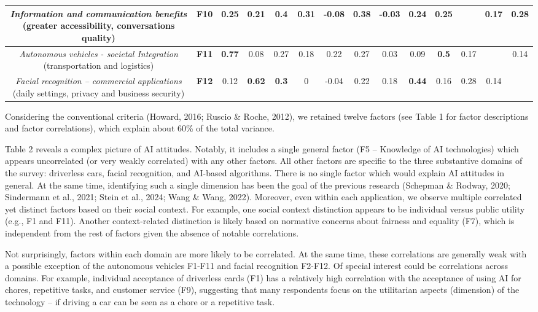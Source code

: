 {\begin{tabular}{c | c | c | c | c | c | c | c | c | c | c | c | c | c}
  \hline
  \textit{Information and communication benefits } (greater accessibility, conversations quality) & \textbf{F10} & 0.25 & 0.21 & \textbf{0.4} & \textbf{0.31} & -0.08 & \textbf{0.38} & -0.03 & 0.24 & 0.25 &  & 0.17 & 0.28 \\
  \hline
  \textit{Autonomous vehicles - societal Integration} (transportation and logistics) & \textbf{F11} & \textbf{0.77} & 0.08 & 0.27 & 0.18 & 0.22 & 0.27 & 0.03 & 0.09 & \textbf{0.5} & 0.17 &  & 0.14 \\
  \hline
  \textit{Facial recognition – commercial applications} (daily settings, privacy and business security) & \textbf{F12} & 0.12 & \textbf{0.62} & \textbf{0.3} & 0 & -0.04 & 0.22 & 0.18 & \textbf{0.44} & 0.16 & 0.28 & 0.14 &  \\
  \hline
\end{tabular}
}

Considering the conventional criteria (Howard, 2016; Ruscio \& Roche, 2012), we retained twelve factors (see Table 1 for factor descriptions and factor correlations), which explain about 60\% of the total variance.

Table 2 reveals a complex picture of AI attitudes. Notably, it includes a single general factor (F5 – Knowledge of AI technologies) which appears uncorrelated (or very weakly correlated) with any other factors. All other factors are specific to the three substantive domains of the survey: driverless cars, facial recognition, and AI-based algorithms. There is no single factor which would explain AI attitudes in general. At the same time, identifying such a single dimension has been the goal of the previous research (Schepman \& Rodway, 2020; Sindermann et al., 2021; Stein et al., 2024; Wang \& Wang, 2022). Moreover, even within each application, we observe multiple correlated yet distinct factors based on their social context. For example, one social context distinction appears to be individual versus public utility (e.g., F1 and F11). Another context-related distinction is likely based on normative concerns about fairness and equality (F7), which is independent from the rest of factors given the absence of notable correlations. 

Not surprisingly, factors within each domain are more likely to be correlated. At the same time, these correlations are generally weak with a possible exception of the autonomous vehicles F1-F11 and facial recognition F2-F12. Of special interest could be correlations across domains. For example, individual acceptance of driverless cards (F1) has a relatively high correlation with the acceptance of using AI for chores, repetitive tasks, and customer service (F9), suggesting that many respondents focus on the utilitarian aspects (dimension) of the technology – if driving a car can be seen as a chore or a repetitive task.

